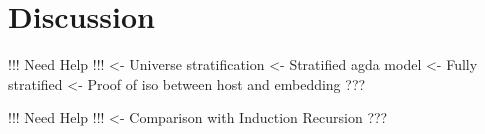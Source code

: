 \section{Discussion}
\label{sec:discussion}

\begin{structure}
!!! Need Help !!!
<- Universe stratification
    <- Stratified agda model
        <- Fully stratified
        <- Proof of iso between host and embedding
    ???
\end{structure}


\begin{structure}
!!! Need Help !!!
<- Comparison with Induction Recursion
    ???
\end{structure}
